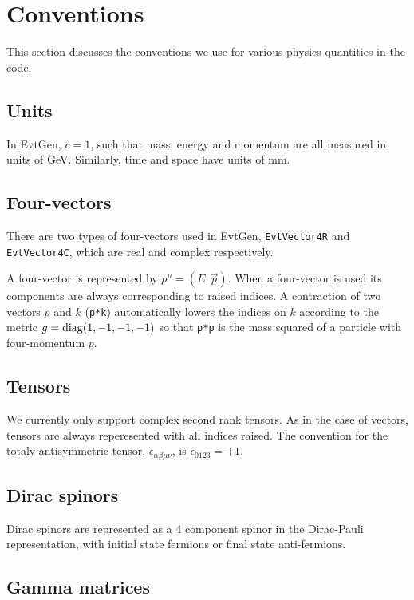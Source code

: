 \section{Conventions}

This section discusses the conventions we use
for various physics quantities in the code.

\subsection{Units}

In EvtGen, $c=1$, such that 
mass, energy and momentum are all measured in units of GeV. 
Similarly, time and space have units of mm.


\subsection{Four-vectors}
There are two types of four-vectors used in EvtGen,
{\tt EvtVector4R} and {\tt EvtVector4C}, which are real and
complex respectively. 

A four-vector is represented by $p^{\mu}=(E,\vec{p})$.
When a four-vector is used its components
are always corresponding to raised indices. 
A contraction of
two vectors $p$ and $k$ ({\tt p*k})  automatically lowers 
the indices on $k$ according to the metric $g={\rm diag}(1,-1,-1,-1)$
so that {\tt p*p} is the mass squared of a particle with
four-momentum $p$.


\subsection{Tensors}

We currently only support complex second rank tensors. As
in the case of vectors, tensors are always reperesented with
all indices raised. The convention for the totaly antisymmetric
tensor, $\epsilon_{\alpha\beta\mu\nu}$, is $\epsilon_{0123}=+1$.

\subsection{Dirac spinors}
\label{sect:diracspinor}

Dirac spinors are represented as a 4 component spinor in the Dirac-Pauli representation,
with initial state fermions or final state anti-fermions. 

\subsection{Gamma matrices}

